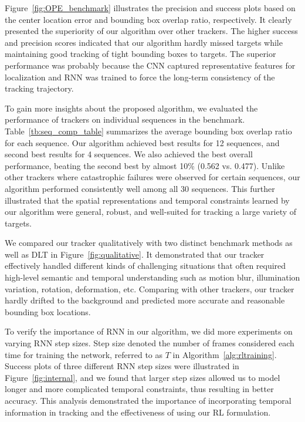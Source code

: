 \documentclass[10pt,twocolumn,letterpaper]{article}
\begin{document}
Figure~\ref{fig:OPE_benchmark} illustrates the precision and success plots based on the center location error and bounding box overlap ratio, respectively. It clearly presented the superiority of our algorithm over other trackers. The higher success and precision scores indicated that our algorithm  hardly missed targets while maintaining good tracking of tight bounding boxes to targets. The superior performance was probably because the CNN captured representative features for localization and RNN was trained to force the long-term consistency of the tracking trajectory. 

To gain more insights about the proposed algorithm, we evaluated the performance of trackers on individual sequences in the benchmark. Table~\ref{tb:seq_comp_table} summarizes the average bounding box overlap ratio for each sequence. Our algorithm achieved best results for 12 sequences, and second best results for 4 sequences. We also achieved the best overall performance, beating the second best by almost 10\% (0.562 vs. 0.477).  Unlike other trackers where catastrophic failures were observed for certain sequences, our algorithm performed consistently well among all 30 sequences. This further illustrated that the spatial representations and temporal constraints learned by our algorithm were general, robust, and well-suited for tracking a large variety of targets. 

We compared our tracker qualitatively with two distinct benchmark methods as well as DLT in Figure~\ref{fig:qualitative}. It demonstrated that our tracker effectively handled different kinds of challenging situations that often required high-level semantic and temporal understanding such as motion blur, illumination variation, rotation, deformation, etc. Comparing with other trackers, our tracker hardly drifted to the background and  predicted more accurate and reasonable bounding box locations.

To verify the importance of RNN in our algorithm, we did more experiments on varying RNN step sizes. Step size denoted the number of frames considered each time for training the network, referred to as $T$ in Algorithm~\ref{alg:rltraining}. Success plots of three different RNN step sizes were illustrated in Figure~\ref{fig:internal}, and we found  that larger step sizes allowed us to model longer and more complicated temporal constraints, thus resulting in better accuracy. This analysis demonstrated the importance of incorporating temporal information in tracking and the effectiveness of using our RL formulation. 
\end{document}
